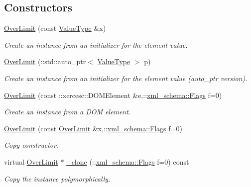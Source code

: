 \subsection*{Constructors}
\begin{DoxyCompactItemize}
\item 
\hyperlink{classopenstack_1_1xml_1_1OverLimit_a1702d793276a5986a9aeb7dc4cf0adf7}{OverLimit} (const \hyperlink{classopenstack_1_1xml_1_1OverLimitAPIFault}{ValueType} \&x)
\begin{DoxyCompactList}\small\item\em Create an instance from an initializer for the element value. \item\end{DoxyCompactList}\item 
\hyperlink{classopenstack_1_1xml_1_1OverLimit_a76466870325f1ed963fb55c1ba650544}{OverLimit} (::std::auto\_\-ptr$<$ \hyperlink{classopenstack_1_1xml_1_1OverLimitAPIFault}{ValueType} $>$ p)
\begin{DoxyCompactList}\small\item\em Create an instance from an initializer for the element value (auto\_\-ptr version). \item\end{DoxyCompactList}\item 
\hyperlink{classopenstack_1_1xml_1_1OverLimit_a03efe325b55775e018aea1a3d20ab118}{OverLimit} (const ::xercesc::DOMElement \&e,::\hyperlink{namespacexml__schema_affb4c227cbd9aa7453dd1dc5a1401943}{xml\_\-schema::Flags} f=0)
\begin{DoxyCompactList}\small\item\em Create an instance from a DOM element. \item\end{DoxyCompactList}\item 
\hyperlink{classopenstack_1_1xml_1_1OverLimit_a97872ba29eeb9f8edf6b06e2ea2d998d}{OverLimit} (const \hyperlink{classopenstack_1_1xml_1_1OverLimit}{OverLimit} \&x,::\hyperlink{namespacexml__schema_affb4c227cbd9aa7453dd1dc5a1401943}{xml\_\-schema::Flags} f=0)
\begin{DoxyCompactList}\small\item\em Copy constructor. \item\end{DoxyCompactList}\item 
virtual \hyperlink{classopenstack_1_1xml_1_1OverLimit}{OverLimit} $\ast$ \hyperlink{classopenstack_1_1xml_1_1OverLimit_abcd2385a3f48c7137ec76ac037e1c194}{\_\-clone} (::\hyperlink{namespacexml__schema_affb4c227cbd9aa7453dd1dc5a1401943}{xml\_\-schema::Flags} f=0) const 
\begin{DoxyCompactList}\small\item\em Copy the instance polymorphically. \item\end{DoxyCompactList}\end{DoxyCompactItemize}
